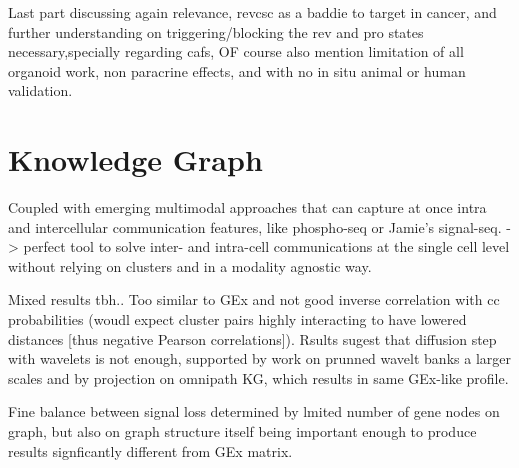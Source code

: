 Last part discussing again relevance, revcsc as a baddie to target in cancer, and further understanding on triggering/blocking the rev and pro states necessary,specially regarding cafs, OF course also mention limitation of all organoid work, non paracrine effects, and with no in situ animal or human validation.


\section{Knowledge Graph}

Coupled with emerging multimodal approaches that can capture at once intra and intercellular communication features, like phospho-seq \cite{blair_phospho-seq_2023} or Jamie's signal-seq. -> perfect tool to solve inter- and intra-cell communications at the single cell level without relying on clusters and in a modality agnostic way. 

Mixed results tbh.. Too similar to GEx and not good inverse correlation with cc probabilities (woudl expect cluster pairs highly interacting to have lowered distances [thus negative Pearson correlations]). Rsults sugest that diffusion step with wavelets is not enough, supported by work on prunned wavelt banks a larger scales and by projection on omnipath KG, which results in same GEx-like profile.

Fine balance between signal loss determined by lmited number of gene nodes on graph, but also on graph structure itself being important enough to produce results signficantly different from GEx matrix.


